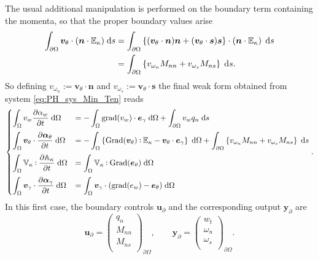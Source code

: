 \documentclass[preprint,12pt]{elsarticle}
\def\onedot{$\mathsurround0pt\ldotp$}
\def\cddot{%
	\mathbin{\vcenter{\baselineskip.67ex
			\hbox{\onedot}\hbox{\onedot}}%
}}
\begin{document}
The usual additional manipulation is performed on the boundary term containing the momenta, so that the proper boundary values arise
\begin{equation}
\label{eq:line1_ipbc_ten_min}
\begin{aligned}
\int_{\partial \Omega} \bm{v}_{\theta} \cdot (\bm{n} \cdot \mathbb{E}_{\kappa})  \d{s} &= \int_{\partial \Omega} \left\{(\bm{v}_{\theta} \cdot \bm{n}) \bm{n} + (\bm{v}_{\theta} \cdot \bm{s}) \bm{s} \right\} \cdot (\bm{n} \cdot \mathbb{E}_{\kappa}) \,  \d{s} \\
&= \int_{\partial \Omega} \left\{ v_{\omega_n} M_{nn} + v_{\omega_s} M_{ns} \right\}  \d{s}.
\end{aligned}
\end{equation}
So defining $v_{\omega_n} :=\bm{v}_{\theta} \cdot \bm{n}$ and $v_{\omega_s} := \bm{v}_{\theta} \cdot \bm{s}$ the final weak form obtained from system \eqref{eq:PH_sys_Min_Ten} reads
\begin{equation}
\label{eq:WF_Min_Dyn}
\begin{cases}
\displaystyle\int_{\Omega} v_w \diffp{\alpha_w}{t}  \d\Omega  &= - \displaystyle\int_{\Omega} \mathrm{grad}(v_w)  \cdot \bm{e}_{\gamma}  \d\Omega +  \displaystyle\int_{\partial \Omega} v_w q_n  \d{s} \vspace{2mm}\\
\displaystyle\int_{\Omega} \bm{v}_{\theta} \cdot \diffp{\bm\alpha_{\theta}}{t}   \d\Omega &=  -\displaystyle\int_{\Omega} \left\{ \mathrm{Grad}(\bm{v}_{\theta}) \cddot \mathbb{E}_{\kappa} - \bm{v}_{\theta} \cdot \bm{e}_{\gamma}\right\}  \d\Omega + \displaystyle\int_{\partial \Omega} \left\{ v_{\omega_n} M_{nn} + v_{\omega_s} M_{ns} \right\}  \d{s} \vspace{2mm} \\
\displaystyle\int_{\Omega} \mathbb{V}_{\kappa} \cddot \diffp{\mathbb{A}_{\kappa}}{t}   \d\Omega &= \displaystyle\int_{\Omega} \mathbb{V}_{\kappa} \cddot \mathrm{Grad}(\bm{e}_\theta)  \d\Omega  \vspace{2mm} \\
\displaystyle\int_{\Omega} \bm{v}_{\gamma} \cdot \diffp{\bm\alpha_{\gamma}}{t}   \d\Omega &= \displaystyle\int_{\Omega} \bm{v}_{\gamma} \cdot (\mathrm{grad}({e}_{w}) - \bm{e}_{\theta})  \d\Omega
\end{cases}.
\end{equation}
In this first case,  the boundary controls $\bm{u}_\partial$ and the corresponding output $\bm{y}_\partial$ are 
\[\bm{u}_\partial = 
\begin{pmatrix}
q_n \\
M_{nn} \\
M_{ns} \\
\end{pmatrix}_{\partial \Omega}, \qquad
\bm{y}_\partial = 
\begin{pmatrix}
w_t \\
\omega_n \\
\omega_s \\
\end{pmatrix}_{\partial \Omega}.
\]
\end{document}
